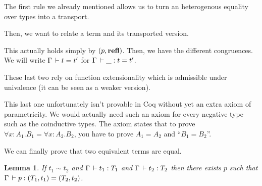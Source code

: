 \documentclass[11pt]{article}
\theoremstyle{plain}
\newtheorem{lemma}[theorem]{Lemma}
\theoremstyle{remark}
\begin{document}
The first rule we already mentioned allows us to turn an heterogenous equality
over types into a transport.
\begin{mathc}
\end{mathc}
Then, we want to relate a term and its transported version.
\begin{mathc}
\end{mathc}
This actually holds simply by $(p,\operatorname{\mathbf{refl}})$.
Then, we have the different congruences.
We will write $\Gamma \,\vdash t = t'$ for $\Gamma \,\vdash \_ : t = t'$.
\begin{mathc}
\end{mathc}
\begin{mathc}
\end{mathc}
These last two rely on function extensionality which is admissible under
univalence (it can be seen as a weaker version).
\begin{mathc}
\end{mathc}
This last one unfortunately isn't provable in Coq without yet an extra axiom
of parametricity. We would actually need such an axiom for every negative
type such as the coinductive types. The axiom states that to prove
$\forall x:A_1.B_1 = \forall x:A_2.B_2$, you have to prove $A_1 = A_2$
and ``$B_1 = B_2$''.

We can finally prove that two equivalent terms are equal.

\begin{lemma}
  \label{lem:simeq}
  If $t_1 \sim t_2$ and $\Gamma \,\vdash t_1 : T_1$ and $\Gamma \,\vdash t_2 : T_2$
  then there exists $p$ such that $\Gamma \,\vdash p : (T_1,t_1) = (T_2,t_2)$.
\end{lemma}
\end{document}
